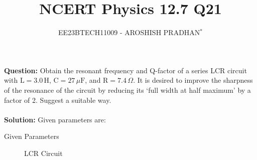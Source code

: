 \documentclass[journal,12pt,twocolumn]{IEEEtran}
\theoremstyle{remark}
\begin{document}

\vspace{3cm}

\title{NCERT Physics 12.7 Q21}
\author{EE23BTECH11009 - AROSHISH PRADHAN$^{*}$%
}
\maketitle
\newpage
\bigskip
\textbf{Question:} 
Obtain the resonant frequency and Q-factor of a series LCR circuit
with $\text{L} = 3.0\, \text{H}$, $\text{C} = 27\, \mu\text{F}$, and $\text{R} = 7.4\, \Omega$. It is desired to improve the
sharpness of the resonance of the circuit by reducing its `full width at half maximum' by a factor of 2. Suggest a suitable way.\\
\\
\textbf{Solution: }
Given parameters are:

\begin{table}[h]
    \centering
    \resizebox{8 cm}{!}{
    }
    \vspace{6 pt}
    \caption{Given Parameters}
    \label{tab:my_label}
\end{table}

\begin{figure}[h]
 \centering
    
    \caption{LCR Circuit}
    \label{fig:enter-label}
\end{figure}
\end{document}
